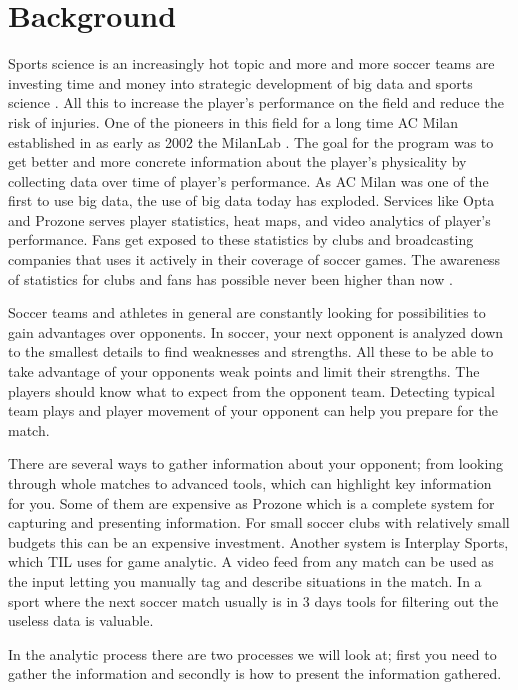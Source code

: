 \section{Background}

Sports science is an increasingly hot topic and more and more soccer teams are investing time and money into strategic development of big data and sports science \cite{bigdata:majorleague}. All this to increase the player’s performance on the field and reduce the risk of injuries. One of the pioneers in this field for a long time AC Milan established in as early as 2002 the MilanLab \cite{bigdata:milanlab}. The goal for the program was to get better and more concrete information about the player’s physicality by collecting data over time of player’s performance. As AC Milan was one of the first to use big data, the use of big data today has exploded. Services like Opta and Prozone serves player statistics, heat maps, and video analytics of player’s performance. Fans get exposed to these statistics by clubs and broadcasting companies that uses it actively in their coverage of soccer games. The awareness of statistics for clubs and fans has possible never been higher than now \cite{dailymailOnStatistics}.

Soccer teams and athletes in general are constantly looking for possibilities to gain advantages over opponents. In soccer, your next opponent is analyzed down to the smallest details to find weaknesses and strengths. All these to be able to take advantage of your opponents weak points and limit their strengths. The players should know what to expect from the opponent team. Detecting typical team plays and player movement of your opponent can help you prepare for the match. 

There are several ways to gather information about your opponent; from looking through whole matches to advanced tools, which can highlight key information for you. Some of them are expensive as Prozone \cite{Prozone:indepth} which is a complete system for capturing and presenting information. For small soccer clubs with relatively small budgets this can be an expensive investment. Another system is Interplay Sports, which \ac{TIL} uses for game analytic. A video feed from any match can be used as the input letting you manually tag and describe situations in the match. In a sport where the next soccer match usually is in 3 days tools for filtering out the useless data is valuable.

In the analytic process there are two processes we will look at; first you need to gather the information and secondly is how to present the information gathered. 

